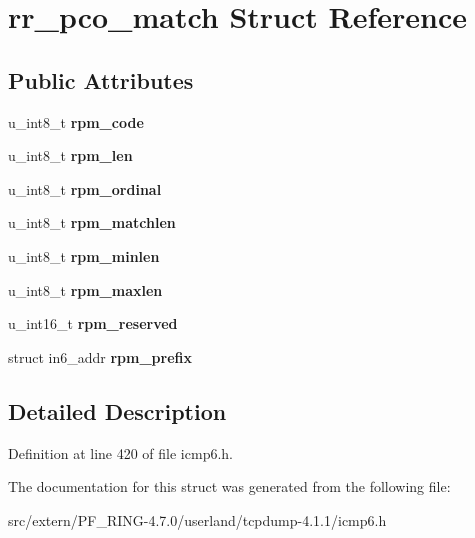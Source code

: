 \hypertarget{structrr__pco__match}{
\section{rr\_\-pco\_\-match Struct Reference}
\label{structrr__pco__match}
}
\subsection*{Public Attributes}
\begin{DoxyCompactItemize}
\item 
\hypertarget{structrr__pco__match_a595118116f1428484c39c00aa8b4de7f}{
u\_\-int8\_\-t {\bfseries rpm\_\-code}}
\label{structrr__pco__match_a595118116f1428484c39c00aa8b4de7f}

\item 
\hypertarget{structrr__pco__match_a88f575d4608d024b69ae8cd7df5d8f1f}{
u\_\-int8\_\-t {\bfseries rpm\_\-len}}
\label{structrr__pco__match_a88f575d4608d024b69ae8cd7df5d8f1f}

\item 
\hypertarget{structrr__pco__match_ad75e1b2ff4fd627b3dcf7812f7291103}{
u\_\-int8\_\-t {\bfseries rpm\_\-ordinal}}
\label{structrr__pco__match_ad75e1b2ff4fd627b3dcf7812f7291103}

\item 
\hypertarget{structrr__pco__match_ad327285855dc6f3e76879028a89ff2c1}{
u\_\-int8\_\-t {\bfseries rpm\_\-matchlen}}
\label{structrr__pco__match_ad327285855dc6f3e76879028a89ff2c1}

\item 
\hypertarget{structrr__pco__match_aa5648d47298f0532983fad976f221627}{
u\_\-int8\_\-t {\bfseries rpm\_\-minlen}}
\label{structrr__pco__match_aa5648d47298f0532983fad976f221627}

\item 
\hypertarget{structrr__pco__match_a19a5828c113917bb52f8afcadae5728d}{
u\_\-int8\_\-t {\bfseries rpm\_\-maxlen}}
\label{structrr__pco__match_a19a5828c113917bb52f8afcadae5728d}

\item 
\hypertarget{structrr__pco__match_a618d84101a7bdc73fc219470a7701e9d}{
u\_\-int16\_\-t {\bfseries rpm\_\-reserved}}
\label{structrr__pco__match_a618d84101a7bdc73fc219470a7701e9d}

\item 
\hypertarget{structrr__pco__match_a7e6329fc5031b52460098f3dab4f5bbf}{
struct in6\_\-addr {\bfseries rpm\_\-prefix}}
\label{structrr__pco__match_a7e6329fc5031b52460098f3dab4f5bbf}

\end{DoxyCompactItemize}


\subsection{Detailed Description}


Definition at line 420 of file icmp6.h.



The documentation for this struct was generated from the following file:\begin{DoxyCompactItemize}
\item 
src/extern/PF\_\-RING-\/4.7.0/userland/tcpdump-\/4.1.1/icmp6.h\end{DoxyCompactItemize}
